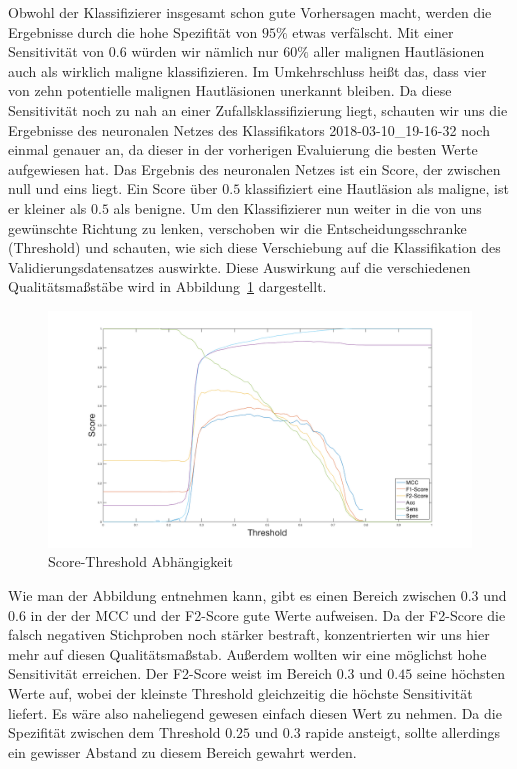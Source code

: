 Obwohl der Klassifizierer insgesamt schon gute Vorhersagen macht, werden die Ergebnisse durch die hohe Spezifität von $95\%$ etwas verfälscht. Mit einer Sensitivität von $0.6$ würden wir nämlich nur $60\%$ aller malignen Hautläsionen auch als wirklich maligne klassifizieren. Im Umkehrschluss heißt das, dass vier von zehn potentielle malignen Hautläsionen unerkannt bleiben. Da diese Sensitivität noch zu nah an einer Zufallsklassifizierung liegt, schauten wir uns die Ergebnisse des neuronalen Netzes des Klassifikators 2018-03-10\_19-16-32 noch einmal genauer an, da dieser in der vorherigen Evaluierung die besten Werte aufgewiesen hat. Das Ergebnis des neuronalen Netzes ist ein Score, der zwischen null und eins liegt. Ein Score über $0.5$ klassifiziert eine Hautläsion als maligne, ist er kleiner als $0.5$ als benigne. Um den Klassifizierer nun weiter in die von uns gewünschte Richtung zu lenken, verschoben wir die Entscheidungsschranke (Threshold) und schauten, wie sich diese Verschiebung auf die Klassifikation des Validierungsdatensatzes auswirkte. Diese Auswirkung auf die verschiedenen Qualitätsmaßstäbe wird in Abbildung~\ref{fig:threshold} dargestellt. 

\begin{figure}[htb!]
	\begin{center}
		\includegraphics[width=\textwidth]{pics/evaluation/treshold.png}
		\caption{Score-Threshold Abhängigkeit}
		\label{fig:threshold}
    \end{center}
\end{figure}

Wie man der Abbildung entnehmen kann, gibt es einen Bereich zwischen $0.3$ und $0.6$ in der der MCC und der F2-Score gute Werte aufweisen. Da der F2-Score die falsch negativen Stichproben noch stärker bestraft, konzentrierten wir uns hier mehr auf diesen Qualitätsmaßstab. Außerdem wollten wir eine möglichst hohe Sensitivität erreichen. Der F2-Score weist im Bereich $0.3$ und $0.45$ seine höchsten Werte auf, wobei der kleinste Threshold gleichzeitig die höchste Sensitivität liefert. Es wäre also naheliegend gewesen einfach diesen Wert zu nehmen. Da die Spezifität zwischen dem Threshold $0.25$ und $0.3$ rapide ansteigt, sollte allerdings ein gewisser Abstand zu diesem Bereich gewahrt werden. 

